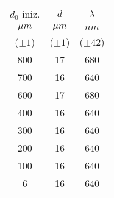 \begin{table}[H]
    \centering
    \begin{tabular}{|c|c|c|}
    \hline
        $d_0$ iniz.	&	$d$	&	$\lambda$ \\
        $\mu m$	&	$\mu m$	&	$nm$ \\
        ($\pm 1$)   & ($\pm 1$) & ($\pm 42$)\\
    \hline
        800	&	17	&	680	\\
        700	&	16	&	640	\\
        600	&	17	&	680	\\
        400	&	16	&	640	\\
        300	&	16	&	640	\\
        200	&	16	&	640	\\
        100	&	16	&	640	\\
        6	&	16	&	640	\\
    \hline    
    \end{tabular}
\end{table}